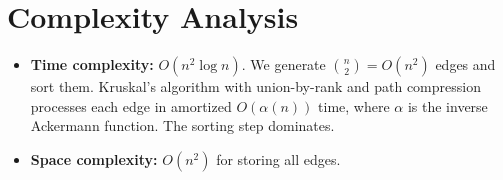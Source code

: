 \documentclass[11pt,a4paper]{article}
\begin{document}
\section{Complexity Analysis}

\begin{itemize}
  \item \textbf{Time complexity:} $O(n^2 \log n)$. We generate $\binom{n}{2} = O(n^2)$
        edges and sort them. Kruskal's algorithm with union-by-rank and path compression
        processes each edge in amortized $O(\alpha(n))$ time, where $\alpha$ is the inverse
        Ackermann function. The sorting step dominates.
  \item \textbf{Space complexity:} $O(n^2)$ for storing all edges.
\end{itemize}
\end{document}
